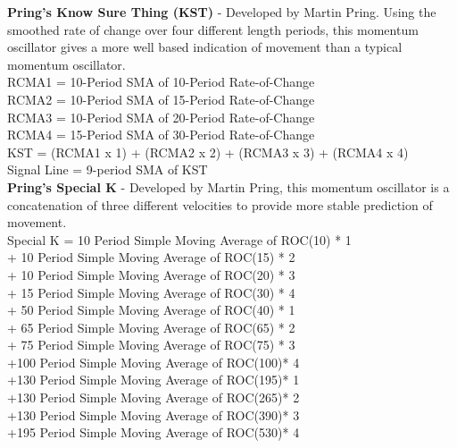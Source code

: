 \documentclass[12pt,a4paper]{article}
\begin{document}
\iffalse
[]
\fi

\textbf{Pring's Know Sure Thing (KST)} - Developed by Martin Pring. Using the smoothed rate of change over four different length periods, this momentum oscillator gives a more well based indication of movement than a typical momentum oscillator. \\

RCMA1 = 10-Period SMA of 10-Period Rate-of-Change \\
RCMA2 = 10-Period SMA of 15-Period Rate-of-Change \\
RCMA3 = 10-Period SMA of 20-Period Rate-of-Change \\
RCMA4 = 15-Period SMA of 30-Period Rate-of-Change \\
KST = (RCMA1 x 1) + (RCMA2 x 2) + (RCMA3 x 3) + (RCMA4 x 4) \\
Signal Line = 9-period SMA of KST \\

\iffalse
[]
\fi

\textbf{Pring's Special K} - Developed by Martin Pring, this momentum oscillator is a concatenation of three different velocities to provide more stable prediction of movement. \\

Special K = 10 Period Simple Moving Average of ROC(10) * 1 \\
            + 10 Period Simple Moving Average of ROC(15) * 2 \\
            + 10 Period Simple Moving Average of ROC(20) * 3 \\
            + 15 Period Simple Moving Average of ROC(30) * 4 \\
            + 50 Period Simple Moving Average of ROC(40) * 1 \\
            + 65 Period Simple Moving Average of ROC(65) * 2 \\
            + 75 Period Simple Moving Average of ROC(75) * 3 \\
            +100 Period Simple Moving Average of ROC(100)* 4 \\
            +130 Period Simple Moving Average of ROC(195)* 1 \\
            +130 Period Simple Moving Average of ROC(265)* 2 \\
            +130 Period Simple Moving Average of ROC(390)* 3 \\
            +195 Period Simple Moving Average of ROC(530)* 4 \\

\iffalse
[]
\fi
\end{document}
